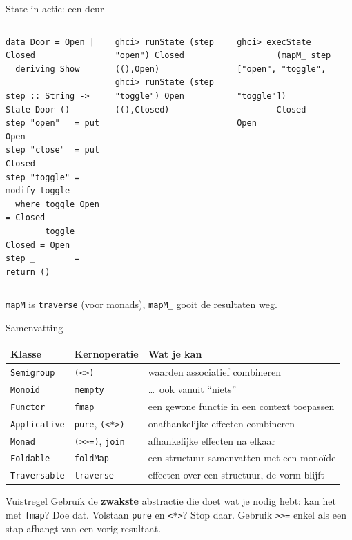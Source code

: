 \documentclass[aspectratio=169,11pt]{beamer}
\newcommand{\hs}{\lstinline[style=hsinline]}
\begin{document}
\begin{frame}[fragile]{State in actie: een deur}
  \begin{columns}[T]
\begin{lstlisting}
data Door = Open | Closed
  deriving Show
 
step :: String -> State Door ()
step "open"   = put Open
step "close"  = put Closed
step "toggle" = modify toggle
  where toggle Open   = Closed
        toggle Closed = Open
step _        = return ()
\end{lstlisting}
\begin{lstlisting}
ghci> runState (step "open") Closed
((),Open)
ghci> runState (step "toggle") Open
((),Closed)
\end{lstlisting}
    \pause
\begin{lstlisting}
ghci> execState
        (mapM_ step ["open", "toggle",
                     "toggle"])
        Closed
Open
\end{lstlisting}
  \end{columns}
  \pause
  \vspace{4pt}
  \hs{mapM} is \hs{traverse} (voor monads), \hs{mapM_} gooit de resultaten weg.
\end{frame}

\begin{frame}[fragile]{Samenvatting}
  \centering
  \small
  \begin{tabular}{lll}
    \toprule
    \textbf{Klasse} & \textbf{Kernoperatie} & \textbf{Wat je kan} \\
    \midrule
    \hs|Semigroup|   & \hs|(<>)|      & waarden associatief combineren \\
    \hs|Monoid|      & \hs|mempty|    & \dots\ ook vanuit ``niets'' \\
    \hs|Functor|     & \hs|fmap|      & een gewone functie in een context toepassen \\
    \hs|Applicative| & \hs|pure|, \hs|(<*>)| & onafhankelijke effecten combineren \\
    \hs|Monad|       & \hs|(>>=)|, \hs|join| & afhankelijke effecten na elkaar \\
    \hs|Foldable|    & \hs|foldMap|   & een structuur samenvatten met een monoïde \\
    \hs|Traversable| & \hs|traverse|  & effecten over een structuur, de vorm blijft \\
    \bottomrule
  \end{tabular}

  \vspace{8pt}
  \raggedright
  \begin{alertblock}{Vuistregel}
    Gebruik de \textbf{zwakste} abstractie die doet wat je nodig hebt:
    kan het met \hs|fmap|? Doe dat. Volstaan \hs|pure| en \hs|<*>|? Stop daar.
    Gebruik \hs|>>=| enkel als een stap afhangt van een vorig resultaat. 
  \end{alertblock}
\end{frame}
 
\end{document}
